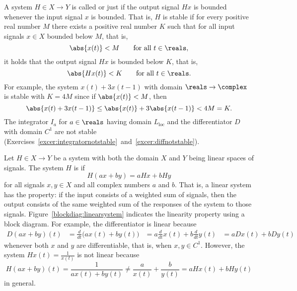 A system $H \in X \to Y$ is called  or just  if the output signal $Hx$ is bounded whenever the input signal $x$ is bounded.  That is, $H$ is stable if for every positive real number $M$ there exists a positive real number $K$ such that for all input signals $x \in X$ bounded below $M$, that is,
\[
\abs{x(t)} < M \qquad \text{for all $t\in\reals$},
\] 
it holds that the output signal $Hx$ is bounded below $K$, that is,
\[
\abs{Hx(t)} < K \qquad \text{for all $t\in\reals$}.
\]
For example, the system $x(t) + 3 x(t-1)$ with domain $\reals \to \complex$ is stable with $K = 4M$ since if $\abs{x(t)} < M$, then 
\[
\abs{x(t) + 3 x(t-1)} \leq \abs{x(t)} + 3 \abs{x(t-1)} < 4 M = K.
\]
The integrator $I_a$ for $a \in \reals$ having domain $L_{\text{loc}}$ and the differentiator $D$ with domain $C^1$ are not stable (Exercises~\ref{excer:integratornotstable}~and~\ref{excer:diffnotstable}).

Let $H \in X \to Y$ be a system with both the domain $X$ and $Y$ being linear spaces of signals.  The system $H$ is  if
\[
H( ax + by) = a Hx + b Hy
\]
for all signals $x, y \in X$ and all complex numbers $a$ and $b$.  That is, a linear system has the property: if the input consists of a weighted sum of signals, then the output consists of the same weighted sum of the responses of the system to those signals.  Figure~\ref{blockdiag:linearsystem} indicates the linearity property using a block diagram.  For example, the differentiator is linear because
\begin{align*}
D(ax + by)(t) &= \frac{d}{dt}\big(ax(t) + by(t)\big) 
&= a\frac{d}{dt}x(t) + b\frac{d}{dt}y(t) 
&= aDx(t) + bDy(t)
\end{align*}
whenever both $x$ and $y$ are differentiable, that is, when $x,y \in C^1$.  
However, the system $Hx(t) = \frac{1}{x(t)}$ is not linear because
\[
H(ax + by)(t) = \frac{1}{ax(t) + by(t)} \neq \frac{a}{x(t)} + \frac{b}{y(t)} = aHx(t) + bHy(t)
\]
in general.  %


